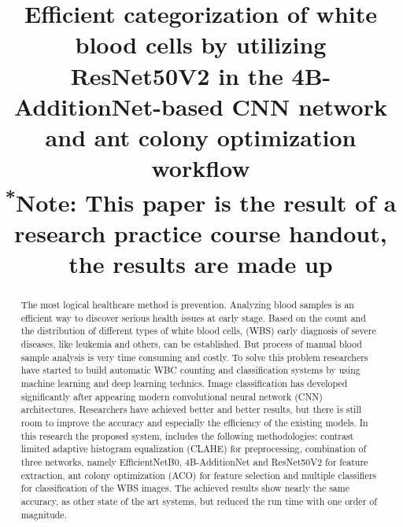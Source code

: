 \documentclass[conference]{IEEEtran}
\begin{document}
\title{Efficient categorization of white blood cells by utilizing ResNet50V2 in the
4B-AdditionNet-based CNN network and ant colony optimization workflow\\
{\footnotesize \textsuperscript{*}Note: This paper is the result of a research practice course handout, the results are made up}
}

\author{
\and
{}
\and
{}
\and
{}
}

\maketitle

\begin{abstract}
The most logical healthcare method is prevention. Analyzing blood samples is an efficient way to discover serious health issues at early stage. 
Based on the count and the distribution of different types of white blood cells, (WBS) early diagnosis of severe diseases, like leukemia and others, can be established. 
But process of manual blood sample analysis is very time consuming and costly. To solve this problem researchers have started to build automatic WBC counting and classification 
systems by using machine learning and deep learning technics. Image classification has developed significantly after appearing modern convolutional neural network (CNN) architectures. 
Researchers have achieved better and better results, but there is still room to improve the accuracy and especially the efficiency of the existing models. 
In this research the proposed system, includes the following methodologies: contrast limited adaptive histogram equalization (CLAHE) for preprocessing, 
combination of three networks, namely EfficientNetB0, 4B-AdditionNet and ResNet50V2 for feature extraction, ant colony optimization (ACO) for feature selection and multiple classifiers 
for classification of the WBS images. The achieved results show nearly the same accuracy, as other state of the art systems, but reduced the run time with one order of magnitude.

\end{abstract}
\end{document}
